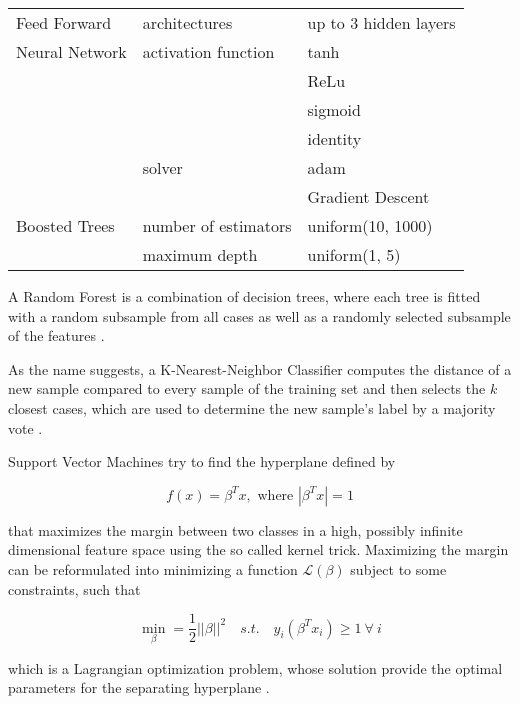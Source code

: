 \begin{table}
\begin{tabular}{lll}
Feed Forward                & architectures               & up to 3 hidden layers                  \\
Neural Network              & activation function         & tanh \\
                            &                             & ReLu \\ 
                            &                             & sigmoid \\
                            &                             & identity       \\
                            & solver                      & adam \\
                            &                             & Gradient Descent     \\
Boosted Trees               & number of estimators        & uniform(10, 1000)                      \\
                            & maximum depth               & uniform(1, 5)                         
\end{tabular}
\end{table}

A Random Forest is a combination of decision trees, where each tree is fitted with a random subsample from all cases as well as a randomly selected subsample of the features \cite{rf01}.

As the name suggests, a K-Nearest-Neighbor Classifier computes the distance of a new sample compared to every sample of the training set and then selects the $k$ closest cases, which are used to determine the new sample's label by a majority vote \cite{knn}.

Support Vector Machines try to find the hyperplane defined by

\begin{equation*}
f(x) = \beta^T x, \text{ where } |\beta^T x| = 1
\end{equation*}

that maximizes the margin between two classes in a high, possibly infinite dimensional feature space using the so called kernel trick. Maximizing the margin can be reformulated into minimizing a function $\mathcal{L}(\beta)$ subject to some constraints, such that

\begin{equation*}
\min_{\beta} = \frac{1}{2} ||\beta||^2 \quad s.t. \quad y_i (\beta^T x_i) \geq 1\ \forall\ i
\end{equation*}

which is a Lagrangian optimization problem, whose solution provide the optimal parameters for the separating hyperplane \cite{svm}.

